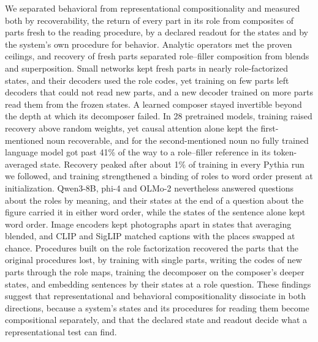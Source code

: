 \documentclass[10pt]{article}
\theoremstyle{plain}
\theoremstyle{remark}
\begin{document}
We separated behavioral from representational compositionality and measured both by recoverability, the return of every part in its role from composites of parts fresh to the reading procedure, by a declared readout for the states and by the system's own procedure for behavior. Analytic operators met the proven ceilings, and recovery of fresh parts separated role--filler composition from blends and superposition. Small networks kept fresh parts in nearly role-factorized states, and their decoders used the role codes, yet training on few parts left decoders that could not read new parts, and a new decoder trained on more parts read them from the frozen states. A learned composer stayed invertible beyond the depth at which its decomposer failed. In 28 pretrained models, training raised recovery above random weights, yet causal attention alone kept the first-mentioned noun recoverable, and for the second-mentioned noun no fully trained language model got past 41\% of the way to a role--filler reference in its token-averaged state. Recovery peaked after about 1\% of training in every Pythia run we followed, and training strengthened a binding of roles to word order present at initialization. Qwen3-8B, phi-4 and OLMo-2 nevertheless answered questions about the roles by meaning, and their states at the end of a question about the figure carried it in either word order, while the states of the sentence alone kept word order. Image encoders kept photographs apart in states that averaging blended, and CLIP and SigLIP matched captions with the places swapped at chance. Procedures built on the role factorization recovered the parts that the original procedures lost, by training with single parts, writing the codes of new parts through the role maps, training the decomposer on the composer's deeper states, and embedding sentences by their states at a role question. These findings suggest that representational and behavioral compositionality dissociate in both directions, because a system's states and its procedures for reading them become compositional separately, and that the declared state and readout decide what a representational test can find.
\end{document}

